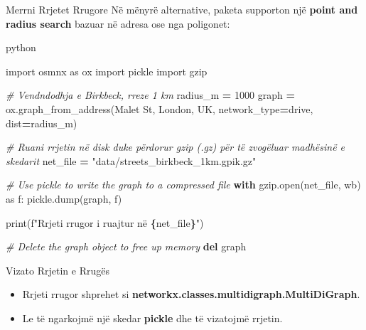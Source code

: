 \documentclass[
  ignorenonframetext,
]{beamer}
\newenvironment{Shaded}{\begin{snugshade}}{\end{snugshade}}
\newcommand{\BuiltInTok}[1]{#1}
\newcommand{\CommentTok}[1]{\textcolor[rgb]{0.56,0.35,0.01}{\textit{#1}}}
\newcommand{\ControlFlowTok}[1]{\textcolor[rgb]{0.13,0.29,0.53}{\textbf{#1}}}
\newcommand{\DecValTok}[1]{\textcolor[rgb]{0.00,0.00,0.81}{#1}}
\newcommand{\ImportTok}[1]{#1}
\newcommand{\KeywordTok}[1]{\textcolor[rgb]{0.13,0.29,0.53}{\textbf{#1}}}
\newcommand{\NormalTok}[1]{#1}
\newcommand{\OperatorTok}[1]{\textcolor[rgb]{0.81,0.36,0.00}{\textbf{#1}}}
\newcommand{\SpecialCharTok}[1]{\textcolor[rgb]{0.81,0.36,0.00}{\textbf{#1}}}
\newcommand{\SpecialStringTok}[1]{\textcolor[rgb]{0.31,0.60,0.02}{#1}}
\newcommand{\StringTok}[1]{\textcolor[rgb]{0.31,0.60,0.02}{#1}}
\begin{document}
\begin{frame}[fragile]{Merrni Rrjetet Rrugore}
\protect\hypertarget{merrni-rrjetet-rrugore-2}{}
Në mënyrë alternative, paketa supporton një \textbf{point and radius
search} bazuar në adresa ose nga poligonet:

python

\begin{Shaded}
\begin{Highlighting}[]
\ImportTok{import}\NormalTok{ osmnx }\ImportTok{as}\NormalTok{ ox}
\ImportTok{import}\NormalTok{ pickle}
\ImportTok{import}\NormalTok{ gzip}

\CommentTok{\# Vendndodhja e Birkbeck, rreze 1 km}
\NormalTok{radius\_m }\OperatorTok{=} \DecValTok{1000}
\NormalTok{graph }\OperatorTok{=}\NormalTok{ ox.graph\_from\_address(}\StringTok{\textquotesingle{}Malet St, London, UK\textquotesingle{}}\NormalTok{, network\_type}\OperatorTok{=}\StringTok{\textquotesingle{}drive\textquotesingle{}}\NormalTok{, dist}\OperatorTok{=}\NormalTok{radius\_m)}

\CommentTok{\# Ruani rrjetin në disk duke përdorur gzip (.gz) për të zvogëluar madhësinë e skedarit}
\NormalTok{net\_file }\OperatorTok{=} \StringTok{"data/streets\_birkbeck\_1km.gpik.gz"}

\CommentTok{\# Use pickle to write the graph to a compressed file}
\ControlFlowTok{with}\NormalTok{ gzip.}\BuiltInTok{open}\NormalTok{(net\_file, }\StringTok{\textquotesingle{}wb\textquotesingle{}}\NormalTok{) }\ImportTok{as}\NormalTok{ f:}
\NormalTok{    pickle.dump(graph, f)}

\BuiltInTok{print}\NormalTok{(}\SpecialStringTok{f"Rrjeti rrugor i ruajtur në }\SpecialCharTok{\{}\NormalTok{net\_file}\SpecialCharTok{\}}\SpecialStringTok{"}\NormalTok{)}

\CommentTok{\# Delete the graph object to free up memory}
\KeywordTok{del}\NormalTok{ graph}
\end{Highlighting}
\end{Shaded}
\end{frame}

\begin{frame}{Vizato Rrjetin e Rrugës}
\protect\hypertarget{vizato-rrjetin-e-rruguxebs}{}
\begin{itemize}
\item
  Rrjeti rrugor shprehet si
  \textbf{networkx.classes.multidigraph.MultiDiGraph}.
\item
  Le të ngarkojmë një skedar \textbf{pickle} dhe të vizatojmë rrjetin.
\end{itemize}
\end{frame}
\end{document}
